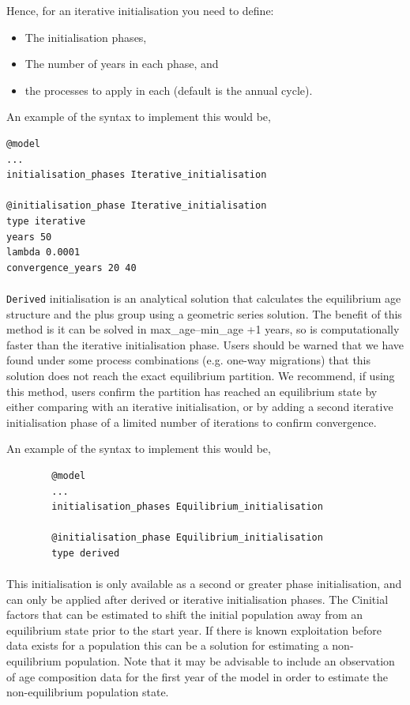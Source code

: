 Hence, for an iterative initialisation you need to define:
\begin{itemize}
  \item The initialisation phases,
  \item The number of years in each phase, and
  \item the processes to apply in each (default is the annual cycle).
\end{itemize}

An example of the syntax to implement this would be,
{\small{\begin{verbatim}
@model
...
initialisation_phases Iterative_initialisation

@initialisation_phase Iterative_initialisation
type iterative
years 50
lambda 0.0001
convergence_years 20 40
\end{verbatim}}}

\paragraph{}

\texttt{Derived} initialisation is an analytical solution that calculates the equilibrium age structure and the plus group using a geometric series solution. The benefit of this method is it can be solved in max\_age--min\_age +1 years, so is computationally faster than the iterative initialisation phase. Users should be warned that we have found under some process combinations (e.g. one-way migrations) that this solution does not reach the exact equilibrium partition. We recommend, if using this method, users confirm the partition has reached an equilibrium state by either comparing with an iterative initialisation, or by adding a second iterative initialisation phase of a limited number of iterations to confirm convergence.

An example of the syntax to implement this would be,
{\small{\begin{verbatim}
		@model
		...
		initialisation_phases Equilibrium_initialisation
		
		@initialisation_phase Equilibrium_initialisation
		type derived
		\end{verbatim}}}
	
\paragraph{}

This initialisation is only available as a second or greater phase initialisation, and can only be applied after derived or iterative initialisation phases. The Cinitial factors that can be estimated to shift the initial population away from an equilibrium state prior to the start year. If there is known exploitation before data exists for a population this can be a solution for estimating a non-equilibrium population. Note that it may be advisable to include an observation of age composition data for the first year of the model in order to estimate the non-equilibrium population state. 

